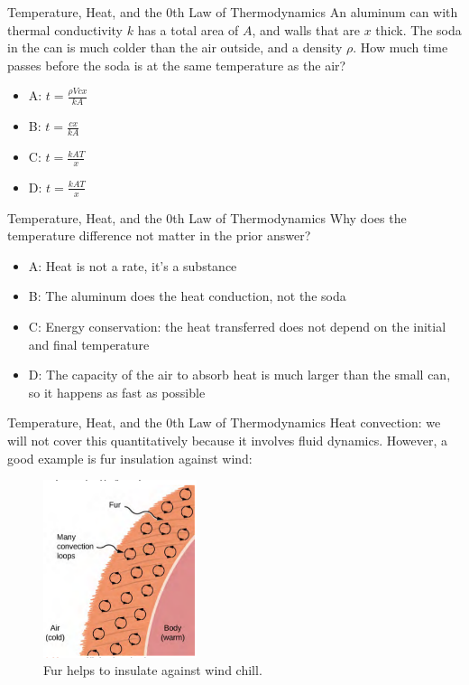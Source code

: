 \documentclass{beamer}
\begin{document}
\begin{frame}{Temperature, Heat, and the 0th Law of Thermodynamics}
An aluminum can with thermal conductivity $k$ has a total area of $A$, and walls that are $x$ thick.  The soda in the can is much colder than the air outside, and a density $\rho$.  How much time passes before the soda is at the same temperature as the air?
\begin{itemize}
\item A: $t = \frac{\rho Vcx}{kA}$
\item B: $t = \frac{cx}{kA}$
\item C: $t = \frac{kAT}{x}$
\item D: $t = \frac{kAT}{x}$
\end{itemize}
\end{frame}

\begin{frame}{Temperature, Heat, and the 0th Law of Thermodynamics}
Why does the temperature difference not matter in the prior answer?
\begin{itemize}
\item A: Heat is not a rate, it's a substance
\item B: The aluminum does the heat conduction, not the soda
\item C: Energy conservation: the heat transferred does not depend on the initial and final temperature
\item D: The capacity of the air to absorb heat is much larger than the small can, so it happens as fast as possible
\end{itemize}
\end{frame}

\begin{frame}{Temperature, Heat, and the 0th Law of Thermodynamics}
Heat convection: we will not cover this quantitatively because it involves fluid dynamics. However, a good example is fur insulation against wind:
\begin{figure}
\centering
\includegraphics[width=0.4\textwidth,trim=0cm 0.1cm 0cm 0.1cm,clip=true]{figures/heat2.png}
\caption{\label{fig:heat2} Fur helps to insulate against wind chill.}
\end{figure}
\end{frame}
\end{document}
